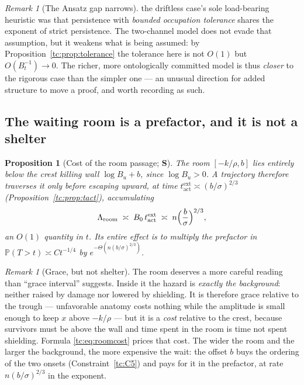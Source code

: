 \documentclass[11pt]{article}
\numberwithin{equation}{section}
\theoremstyle{plain}
\newtheorem{proposition}[theorem]{Proposition}
\theoremstyle{definition}
\theoremstyle{remark}
\newtheorem{remark}[theorem]{Remark}
\newcommand{\PP}{\mathbb{P}}
\begin{document}
\begin{remark}[The Ansatz gap narrows]\label{tc:rem:gapnarrows}
the driftless case's sole load-bearing heuristic was that persistence with
\emph{bounded occupation tolerance} shares the exponent of strict
persistence. The two-channel model does not evade that assumption, but
it weakens what is being assumed: by
Proposition~\ref{tc:prop:tolerance} the tolerance here is not $O(1)$ but
$O(B_t^{-1})\to0$. The richer, more ontologically committed model is
thus \emph{closer} to the rigorous case than the simpler one --- an
unusual direction for added structure to move a proof, and worth
recording as such.
\end{remark}

\subsection{The waiting room is a prefactor, and it is not a
shelter}\label{tc:subsub:roomcost}

\begin{proposition}[Cost of the room passage; \textbf{S}]
\label{tc:prop:roomcost}
The room $[-k/\rho,b]$ lies entirely below the crest killing wall
$\log B_u+b$, since $\log B_u>0$. A trajectory therefore traverses it
only before escaping upward, at time
$t^{\mathrm{ext}}_{\mathrm{act}}\asymp(b/\sigma)^{2/3}$
(Proposition~\ref{tc:prop:tact}), accumulating
\begin{equation}\label{tc:eq:roomcost}
\Lambda_{\mathrm{room}}\;\asymp\;
B_0\,t^{\mathrm{ext}}_{\mathrm{act}}
\;\asymp\;n\Bigl(\frac{b}{\sigma}\Bigr)^{2/3},
\end{equation}
an $O(1)$ quantity in $t$. Its entire effect is to multiply the
prefactor in $\PP(T>t)\asymp Ct^{-1/4}$ by
$e^{-\Theta\left(n(b/\sigma)^{2/3}\right)}$.
\end{proposition}

\begin{remark}[Grace, but not shelter]\label{tc:rem:notshelter}
The room deserves a more careful reading than ``grace interval''
suggests. Inside it the hazard is \emph{exactly the background}: neither
raised by damage nor lowered by shielding. It is therefore grace
relative to the trough --- unfavorable anatomy costs nothing while the
amplitude is small enough to keep $x$ above $-k/\rho$ --- but it is a
\emph{cost} relative to the crest, because survivors must be above the
wall and time spent in the room is time not spent shielding. Formula
\eqref{tc:eq:roomcost} prices that cost. The wider the room and the
larger the background, the more expensive the wait: the offset $b$ buys
the ordering of the two onsets (Constraint~\ref{tc:C5}) and pays for it
in the prefactor, at rate $n(b/\sigma)^{2/3}$ in the exponent.
\end{remark}
\end{document}
